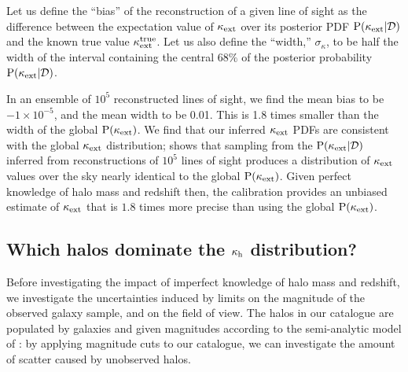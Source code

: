 \documentclass[useAMS,usenatbib,a4paper]{mn2e}
\begin{document}
Let us define the ``bias'' of the reconstruction of a given line of sight as
the difference between the expectation value of $\kappa_{\rm ext}$ over its posterior
PDF ${\rm P}(\kappa_{\rm ext}|{\mathcal{D}})$ and the known true value $\kappa_{\rm ext}^{\mathrm{true}}$.
Let us also define the ``width,'' $\sigma_{\kappa}$, to be half the width of
the interval containing the central $68\%$ of the posterior probability
${\rm P}(\kappa_{\rm ext}|{\mathcal{D}})$. 

In an ensemble of $10^{5}$ reconstructed lines of sight, we find the mean bias
to be $-1\times 10^{-5}$, and the mean width to be 0.01. This is
1.8 times smaller than the width of the global ${\rm P}(\kappa_{\rm ext})$.  We find that
our inferred $\kappa_{\rm ext}$ PDFs are consistent with the global $\kappa_{\rm ext}$
distribution;  shows that sampling from the
${\rm P}(\kappa_{\rm ext}|{\mathcal{D}})$ inferred from reconstructions of  $10^{5}$ lines of
sight  produces a distribution of $\kappa_{\rm ext}$ values over the sky nearly identical to
the global ${\rm P}(\kappa_{\rm ext})$. Given perfect knowledge of halo mass and redshift
then, the calibration \proceedure provides an unbiased estimate of $\kappa_{\rm ext}$
that is $1.8$ times more precise than using the global ${\rm P}(\kappa_{\rm ext})$. 


\subsection{Which halos dominate the $\kappa_{\rm h}$ distribution?}

Before investigating the impact of imperfect knowledge of halo
mass and redshift, we investigate the uncertainties induced by limits on the
magnitude of the observed galaxy sample, and on the field of view. The halos
in our catalogue are populated by galaxies and given magnitudes according to
the semi-analytic model of \citet{DeLucia+Blaizot2007}: by applying magnitude
cuts to our catalogue, we can investigate the amount of scatter caused by
unobserved halos. 
\end{document}
